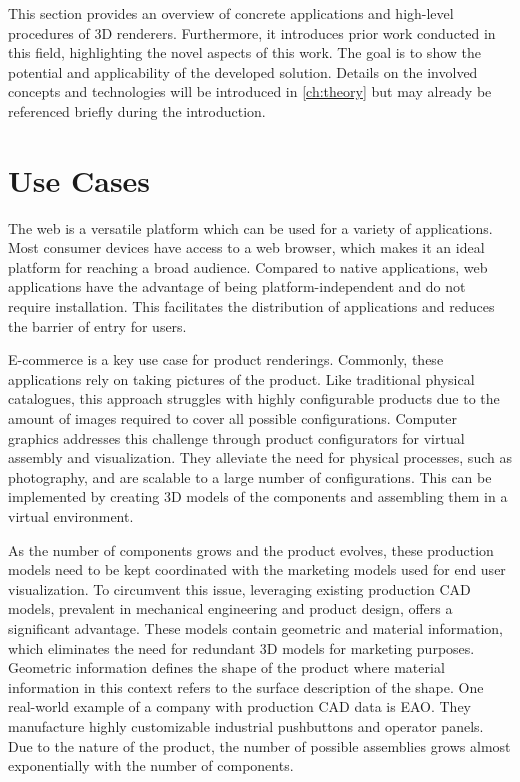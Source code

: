 
This section provides an overview of concrete applications and high-level procedures of 3D renderers. Furthermore, it introduces prior work conducted in this field, highlighting the novel aspects of this work. The goal is to show the potential and applicability of the developed solution. Details on the involved concepts and technologies will be introduced in \autoref{ch:theory} but may already be referenced briefly during the introduction.

\section{Use Cases}

The web is a versatile platform which can be used for a variety of applications. Most consumer devices have access to a web browser, which makes it an ideal platform for reaching a broad audience. Compared to native applications, web applications have the advantage of being platform-independent and do not require installation. This facilitates the distribution of applications and reduces the barrier of entry for users.

E-commerce is a key use case for product renderings. Commonly, these applications rely on taking pictures of the product. Like traditional physical catalogues, this approach struggles with highly configurable products due to the amount of images required to cover all possible configurations. Computer graphics addresses this challenge through product configurators for virtual assembly and visualization. They alleviate the need for physical processes, such as photography, and are scalable to a large number of configurations. This can be implemented by creating 3D models of the components and assembling them in a virtual environment.

As the number of components grows and the product evolves, these production models need to be kept coordinated with the marketing models used for end user visualization. To circumvent this issue, leveraging existing production \gls{CAD} models, prevalent in mechanical engineering and product design, offers a significant advantage. These models contain geometric and material information, which eliminates the need for redundant 3D models for marketing purposes. Geometric information defines the shape of the product where material information in this context refers to the surface description of the shape. One real-world example of a company with production \gls{CAD} data is EAO. They manufacture highly customizable industrial pushbuttons and operator panels. Due to the nature of the product, the number of possible assemblies grows almost exponentially with the number of components.


